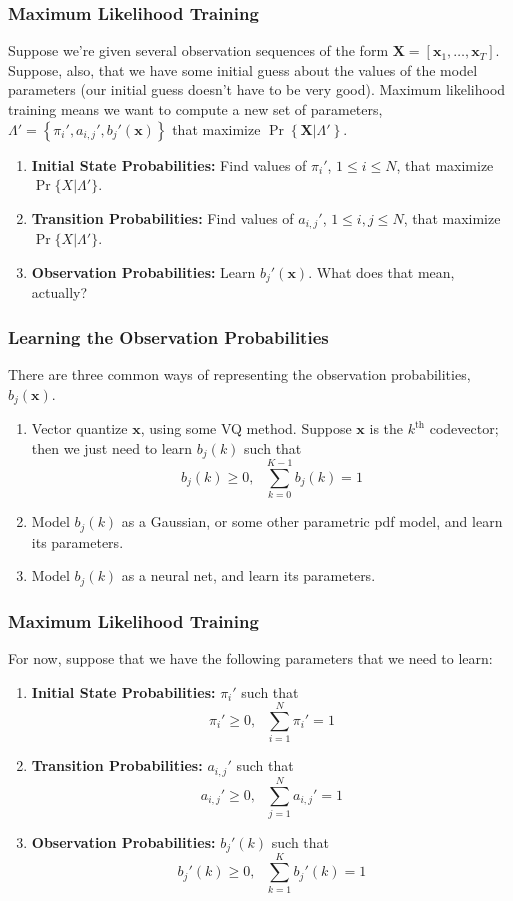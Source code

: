\documentclass{beamer}
\begin{document}
\begin{frame}
  \frametitle{Maximum Likelihood Training}
  
  Suppose we're given several observation sequences of the form
  $\mathbf{X}=[\mathbf{x}_1,\ldots,\mathbf{x}_T]$.  Suppose, also, that we have some
  initial guess about the values of the model parameters (our initial
  guess doesn't have to be very good).  Maximum likelihood training
  means we want to compute a new set of parameters,
  $\Lambda'=\left\{\pi_i',a_{i,j}',b_j'(\mathbf{x})\right\}$ that maximize
  $\Pr\left\{\mathbf{X}|\Lambda'\right\}$.
  \begin{enumerate}
  \item {\bf Initial State Probabilities:} Find values of $\pi_i'$, $1\le
    i\le N$, that maximize $\Pr\{X|\Lambda'\}$.
  \item {\bf Transition Probabilities:} Find values of $a_{i,j}'$, $1\le
    i,j\le N$, that maximize $\Pr\{X|\Lambda'\}$.
  \item {\bf Observation Probabilities:} Learn $b_j'(\mathbf{x})$.  What does that
    mean, actually?
  \end{enumerate}
\end{frame}

\begin{frame}
  \frametitle{Learning the Observation Probabilities}

  There are three common ways of representing the observation probabilities, $b_j(\mathbf{x})$.
    \begin{enumerate}
    \item Vector quantize $\mathbf{x}$, using some VQ method.  Suppose
      $\mathbf{x}$ is the $k^{\textrm{th}}$ codevector; then we just need
      to learn $b_j(k)$ such that
      \[
      b_j(k)\ge 0,~~~\sum_{k=0}^{K-1} b_j(k)=1
      \]
    \item Model $b_j(k)$ as a Gaussian, or some other parametric pdf
      model, and learn its parameters.
    \item Model $b_j(k)$ as a neural net, and learn its parameters.
    \end{enumerate}
\end{frame}
  
\begin{frame}
  \frametitle{Maximum Likelihood Training}
  
  For now, suppose that we have the following parameters that we need to learn:
  \begin{enumerate}
  \item {\bf Initial State Probabilities:} $\pi_i'$ such that
    \[
    \pi_i' \ge 0,~~~\sum_{i=1}^N \pi_i' = 1
    \]
  \item {\bf Transition Probabilities:} $a_{i,j}'$ such that
    \[
    a_{i,j}'\ge 0,~~~\sum_{j=1}^N a_{i,j}' =1
    \]
  \item {\bf Observation Probabilities:} $b_j'(k)$ such that
    \[
    b_j'(k)\ge 0,~~~\sum_{k=1}^{K} b_j'(k)=1
    \]
  \end{enumerate}
\end{frame}
\end{document}

